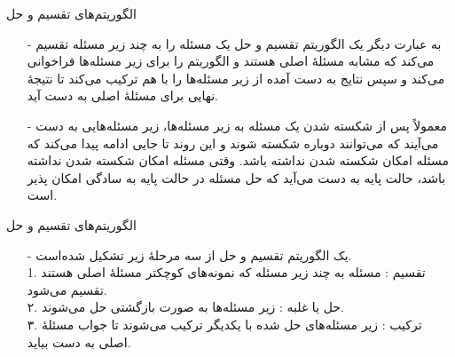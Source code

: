 \begin{frame}{‌الگوریتم‌های تقسیم و حل}
\begin{itemize}\itemr
\item[-]
به عبارت دیگر یک الگوریتم تقسیم و حل یک مسئله را به چند زیر مسئله تقسیم می‌کند که مشابه مسئلهٔ اصلی هستند و الگوریتم را برای زیر مسئله‌ها فراخوانی می‌کند و سپس نتایج به دست آمده از زیر مسئله‌ها را با هم ترکیب می‌کند تا نتیجهٔ نهایی برای مسئلهٔ اصلی به دست آید.
\item[-]
معمولاً‌ پس از شکسته شدن یک مسئله به زیر مسئله‌ها، زیر مسئله‌هایی به دست می‌آیند که می‌توانند دوباره شکسته شوند و این روند تا جایی ادامه پیدا می‌کند که مسئله امکان شکسته شدن نداشته باشد. وقتی مسئله امکان شکسته شدن نداشته باشد، حالت پایه
به دست می‌آید که حل مسئله در حالت پایه به سادگی امکان پذیر است.
\end{itemize}
\end{frame}


\begin{frame}{‌الگوریتم‌های تقسیم و حل}
\begin{itemize}\itemr
\item[-]
یک الگوریتم تقسیم و حل از سه مرحلهٔ زیر تشکیل شده‌است.\\
1. تقسیم
: مسئله به چند زیر مسئله که نمونه‌های کوچکتر مسئلهٔ اصلی هستند تقسیم می‌شود.\\
۲. حل یا غلبه
: زیر مسئله‌ها به صورت بازگشتی حل می‌شوند.\\
۳. ترکیب
: زیر مسئله‌های حل شده با یکدیگر ترکیب می‌شوند تا جواب مسئلهٔ اصلی به دست بیاید.
\end{itemize}
\end{frame}
